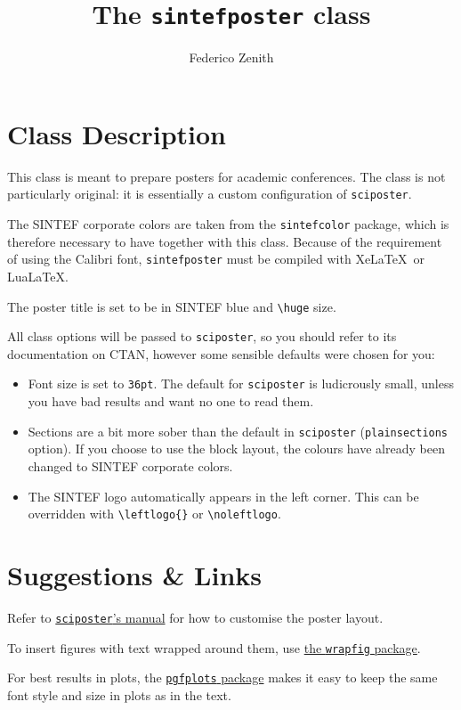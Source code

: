 \documentclass{sintefposter}
\title{The \texttt{sintefposter} class}
\author{Federico Zenith}
\institute{SINTEF Applied Cybernetics, Trondheim, Norway}
\begin{document}
\maketitle

\begin{multicols}{3}
\section*{Class Description}
This class is meant to prepare posters for academic conferences.
The class is not particularly original: it is essentially a custom configuration
of \texttt{sciposter}.

The SINTEF corporate colors are taken from the \texttt{sintefcolor} package,
which is therefore necessary to have together with this class.
Because of the requirement of using the Calibri font, \texttt{sintefposter} must
be compiled with Xe\LaTeX\ or Lua\LaTeX.

The poster title is set to be in SINTEF blue and \verb|\huge| size.

All class options will be passed to \texttt{sciposter}, so you should refer to
its documentation on CTAN, however some sensible defaults were chosen for you:
\begin{itemize}
  \item Font size is set to \texttt{36pt}. The default for \texttt{sciposter} is
        ludicrously small, unless you have bad results and want no one to read
        them.
  \item Sections are a bit more sober than the default in \texttt{sciposter}
        (\texttt{plainsections} option).
        If you choose to use the block layout, the colours have already been
        changed to SINTEF corporate colors.
  \item The SINTEF logo automatically appears in the left corner.
        This can be overridden with \verb|\leftlogo{}| or \verb|\noleftlogo|.
\end{itemize}

\section*{Suggestions \& Links}
Refer to
\href{http://mirrors.ctan.org/macros/latex/contrib/sciposter/scipostermanual.pdf}
{\texttt{sciposter}'s manual} for how to customise the poster layout.

To insert figures with text wrapped around them, use
\href{http://mirrors.ctan.org/macros/latex/contrib/wrapfig/wrapfig-doc.pdf}{the
\texttt{wrapfig} package}.

For best results in plots, the
\href{http://mirrors.ctan.org/graphics/pgf/contrib/pgfplots/doc/latex/pgfplots/pgfplots.pdf}
{\texttt{pgfplots} package} makes it easy to keep the same font style and size
in plots as in the text.

\end{multicols}
\end{document}
